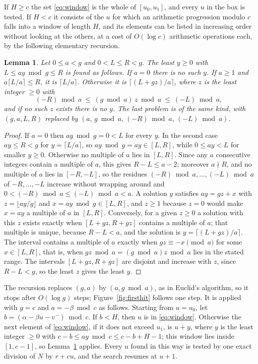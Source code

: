 \documentclass[11pt,reqno]{amsart}
\numberwithin{equation}{section}
\theoremstyle{plain}
\newtheorem{lemma}[theorem]{Lemma}
\theoremstyle{definition}
\theoremstyle{remark}
\begin{document}
If $H\ge c$ the set \eqref{eq:window} is the whole of $[u_0,u_1]$,
and every $u$ in the box is tested. If $H<c$ it consists of the $u$
for which an arithmetic progression modulo $c$ falls into a window of
length $H$, and its elements can be listed in increasing order without
looking at the others, at a cost of $O(\log c)$ arithmetic operations
each, by the following elementary recursion.

\begin{lemma}\label{lem:firsthit}
Let $0\le a<g$ and $0<L\le R<g$. The least $y\ge0$ with
$L\le ay\bmod g\le R$ is found as follows. If $a=0$ there is no such
$y$. If $a\ge1$ and $a\lceil L/a\rceil\le R$, it is $\lceil L/a\rceil$.
Otherwise it is $\lceil(L+gz)/a\rceil$, where $z$ is the least integer
$\ge0$ with
\[
  (-R)\bmod a\ \le\ (g\bmod a)\,z\bmod a\ \le\ (-L)\bmod a ,
\]
and if no such $z$ exists there is no $y$. The last problem is of the
same kind, with $(g,a,L,R)$ replaced by
$(a,\,g\bmod a,\,(-R)\bmod a,\,(-L)\bmod a)$.
\end{lemma}

\begin{proof}
If $a=0$ then $ay\bmod g=0<L$ for every $y$. In the second case
$ay\le R<g$ for $y=\lceil L/a\rceil$, so $ay\bmod g=ay\in[L,R]$, while
$0\le ay<L$ for smaller $y\ge0$. Otherwise no multiple of $a$ lies in
$[L,R]$. Since any $a$ consecutive integers contain a multiple of $a$,
this gives $R-L\le a-2$; moreover $a\nmid R$, and no multiple of $a$
lies in $[-R,-L]$, so the residues $(-R)\bmod a,\dots,(-L)\bmod a$ of
$-R,\dots,-L$ increase without wrapping around and
$0<(-R)\bmod a\le(-L)\bmod a<a$. A solution $y$ satisfies $ay=gz+x$
with $z=\lfloor ay/g\rfloor$ and $x=ay\bmod g\in[L,R]$, and $z\ge1$
because $z=0$ would make $x=ay$ a multiple of $a$ in $[L,R]$.
Conversely, for a given $z\ge0$ a solution with this $z$ exists
exactly when $[L+gz,R+gz]$ contains a multiple of $a$; that multiple
is unique, because $R-L<a$, and the solution is
$y=\lceil(L+gz)/a\rceil$. The
interval contains a multiple of $a$ exactly when $gz\equiv-x\pmod a$
for some $x\in[L,R]$, that is, when $gz\bmod a=(g\bmod a)z\bmod a$
lies in the stated range. The intervals $[L+gz,R+gz]$ are disjoint
and increase with $z$, since $R-L<g$, so the least $z$ gives the least
$y$.
\end{proof}

The recursion replaces $(g,a)$ by $(a,g\bmod a)$, as in Euclid's
algorithm, so it stops after $O(\log g)$ steps; Figure~\ref{fig:firsthit}
follows one step. It is applied with
$g=c$ and $a=-\beta\bmod c$ as follows. Starting from $u=u_0$, let
$b=(\alpha-\beta u-v^-)\bmod c$. If $b<H$, then $u$ is in
\eqref{eq:window}. Otherwise the next element of \eqref{eq:window}, if it
does not exceed $u_1$, is $u+y$, where $y$ is the least integer $\ge0$ with
$c-b\le ay\bmod c\le c-b+H-1$; this window lies inside $[1,c-1]$, so
Lemma~\ref{lem:firsthit} applies. Every $u$ found in this way is
tested by one exact division of $N$ by $r+cu$, and the search resumes
at $u+1$.
\end{document}
